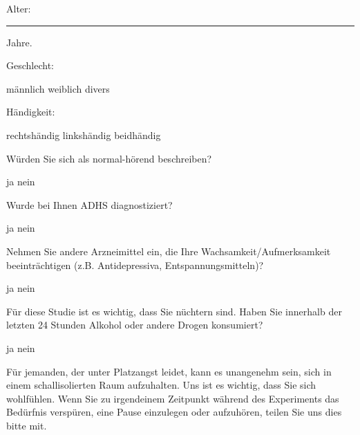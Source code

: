 \documentclass[a4paper,12pt,addpoints]{exam}
\begin{document}
\begin{questions}
  \question Alter: \rule{2cm}{0.6pt} Jahre.

  \question Geschlecht:
  \begin{oneparcheckboxes}
   \choice männlich
   \choice weiblich
   \choice divers
  \end{oneparcheckboxes}

  \question Händigkeit:
  \begin{oneparcheckboxes}
   \choice rechtshändig
   \choice linkshändig
   \choice beidhändig
  \end{oneparcheckboxes}

  \question Würden Sie sich als normal-hörend beschreiben?
  \begin{oneparcheckboxes}
   \choice ja
   \choice nein
  \end{oneparcheckboxes}

  \question Wurde bei Ihnen ADHS diagnostiziert?
  \begin{oneparcheckboxes}
   \choice ja
   \choice nein
  \end{oneparcheckboxes}


\question Nehmen Sie andere Arzneimittel ein, die Ihre Wachsamkeit/Aufmerksamkeit beeinträchtigen (z.B. Antidepressiva, Entspannungsmitteln)?
  \begin{oneparcheckboxes}
   \choice ja
   \choice nein
  \end{oneparcheckboxes}

\question Für diese Studie ist es wichtig, dass Sie nüchtern sind. Haben Sie innerhalb der letzten 24 Stunden Alkohol oder andere Drogen konsumiert?
  \begin{oneparcheckboxes}
   \choice ja
   \choice nein
  \end{oneparcheckboxes}


\end{questions}

\noindent Für jemanden, der unter Platzangst leidet, kann es unangenehm sein, sich in einem schallisolierten Raum aufzuhalten. Uns ist es wichtig, dass Sie sich wohlfühlen. Wenn Sie zu irgendeinem Zeitpunkt während des Experiments das Bedürfnis verspüren, eine Pause einzulegen oder aufzuhören, teilen Sie uns dies bitte mit.\\
\end{document}
